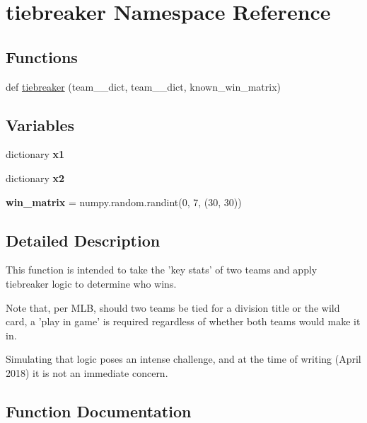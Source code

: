 \hypertarget{namespacetiebreaker}{}\section{tiebreaker Namespace Reference}
\label{namespacetiebreaker}
\subsection*{Functions}
\begin{DoxyCompactItemize}
\item 
def \hyperlink{namespacetiebreaker_a044e88269ce997e0e5ecff8c014631ec}{tiebreaker} (team\+\_\+\_\+dict, team\+\_\+\_\+dict, known\+\_\+win\+\_\+matrix)
\end{DoxyCompactItemize}
\subsection*{Variables}
\begin{DoxyCompactItemize}
\item 
dictionary {\bfseries x1}
\item 
dictionary {\bfseries x2}
\item 
{\bfseries win\+\_\+matrix} = numpy.\+random.\+randint(0, 7, (30, 30))\hypertarget{namespacetiebreaker_a89d63b4336afbd7f70ed64aa864ebe3b}{}\label{namespacetiebreaker_a89d63b4336afbd7f70ed64aa864ebe3b}

\end{DoxyCompactItemize}


\subsection{Detailed Description}
\begin{DoxyVerb}This function is intended to take the 'key stats' of two teams
and apply tiebreaker logic to determine who wins.

Note that, per MLB, should two teams be tied for a division title
or the wild card, a 'play in game' is required regardless of whether both
teams would make it in.

Simulating that logic poses an intense challenge, and at the time of writing
(April 2018) it is not an immediate concern.\end{DoxyVerb}
 

\subsection{Function Documentation}
